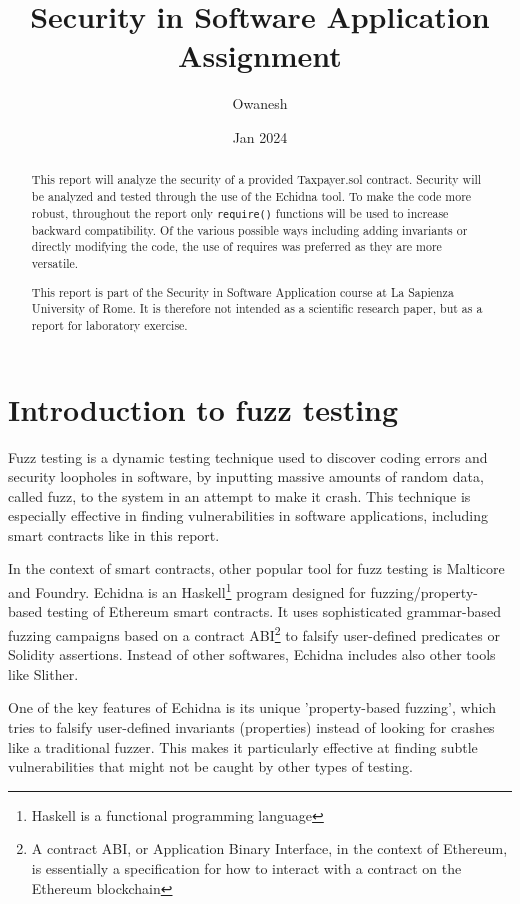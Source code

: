\documentclass{article}
\title{Security in Software Application Assignment}
\author{Owanesh}
\date{Jan 2024}
\begin{document}
\maketitle

\begin{abstract}
    This report will analyze the security of a provided Taxpayer.sol 
    contract. Security will be analyzed and tested through the use of 
    the Echidna tool. To make the code more robust, throughout the report 
    only \texttt{require()} functions will be used to increase backward compatibility. Of the various possible ways including adding invariants or directly modifying the code, the use of requires was preferred as they are more versatile.

    This report is part of the Security in Software Application course at La Sapienza University of Rome. It is therefore not intended as a scientific research paper, but as a report for laboratory exercise.
\end{abstract}

\tableofcontents

\section{Introduction to fuzz testing}
Fuzz testing is a dynamic testing technique used to discover coding 
errors and security loopholes in software, by inputting massive amounts 
of random data, called fuzz, to the system in an attempt to make it crash. 
This technique is especially effective in finding vulnerabilities in 
software applications, including smart contracts like in this report.

In the context of smart contracts, other popular tool for 
fuzz testing is Malticore and Foundry. Echidna is an Haskell\footnote{Haskell is a functional programming language} program designed 
for fuzzing/property-based testing of Ethereum smart contracts. 
It uses sophisticated grammar-based fuzzing campaigns based 
on a contract ABI\footnote{A contract ABI, or Application Binary Interface, in the context of Ethereum, is essentially a specification for how to interact with a contract on the Ethereum blockchain} to falsify user-defined predicates or Solidity assertions.
Instead of other softwares, Echidna includes also other tools like Slither.

One of the key features of Echidna is its unique 'property-based fuzzing',
 which tries to falsify user-defined invariants (properties) 
 instead of looking for crashes like a traditional fuzzer. 
 This makes it particularly effective at finding subtle vulnerabilities that might not be caught by other types of testing.
\end{document}
